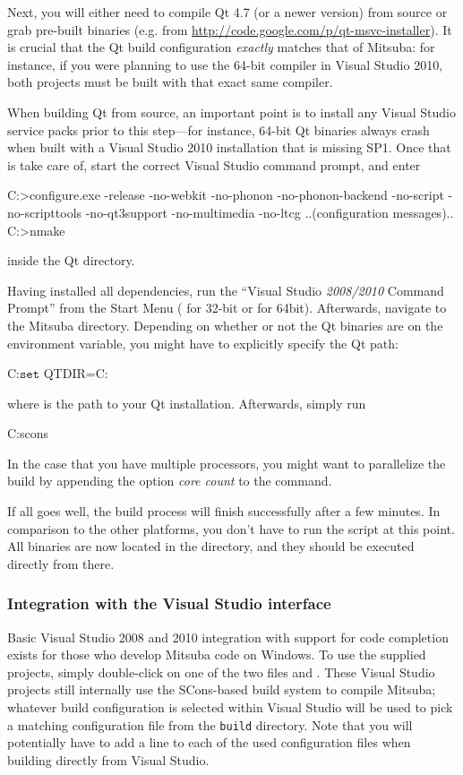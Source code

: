 Next, you will either need to compile Qt 4.7 (or a newer version) from 
source or grab pre-built binaries (e.g. from 
\url{http://code.google.com/p/qt-msvc-installer}). 
It is crucial that the Qt build configuration \emph{exactly} matches that of Mitsuba: 
for instance, if you were planning to use the 64-bit compiler in Visual 
Studio 2010, both projects must be built with that exact same compiler.

When building Qt from source, an important point is to install any 
Visual Studio service packs prior to this step---for instance, 64-bit
Qt binaries always crash when built with a Visual Studio 2010 installation
that is missing SP1. Once that is take care of, start the correct Visual Studio command 
prompt, and enter
\begin{shell}
C:\Qt>configure.exe -release -no-webkit -no-phonon -no-phonon-backend -no-script
      -no-scripttools -no-qt3support -no-multimedia -no-ltcg
..(configuration messages)..
C:\Qt>nmake
\end{shell}
inside the Qt directory.

Having installed all dependencies, run the ``Visual Studio \emph{2008/2010} Command 
Prompt'' from the Start Menu ( for 32-bit or  for 64bit). Afterwards,
navigate to the Mitsuba directory.
Depending on whether or not the Qt binaries are on the 
environment variable, you might have to explicitly specify the Qt path:
\begin{shell}
C:\Mitsuba\>$\texttt{set}$ QTDIR=C:\Qt
\end{shell}
where  is the path to your Qt installation.
Afterwards, simply run
\begin{shell}
C:\Mitsuba\>scons
\end{shell}
In the case that you have multiple processors, you might want to parallelize the build by appending the option \emph{core count} to the  command.

If all goes well, the build process will finish successfully after a few
minutes. In comparison to the other platforms, you don't have to run the  script at this point. 
All binaries are now located in the  directory, and they should be executed directly from there.

\subsubsection{Integration with the Visual Studio interface}
Basic Visual Studio 2008 and 2010 integration with support for code completion 
exists for those who develop Mitsuba code on Windows. 
To use the supplied projects, simply double-click on one of the two files  
and . These Visual Studio projects still internally
use the SCons-based build system to compile Mitsuba; whatever 
build configuration is selected within Visual Studio will be used to pick a matching
configuration file from the \texttt{build} directory. Note that you will
potentially have to add a  line to each of the
used configuration files when building directly from Visual Studio.

